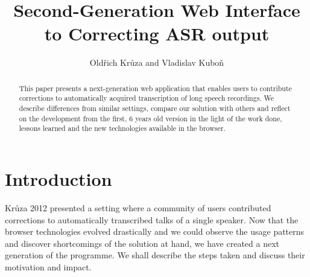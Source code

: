 \documentclass{svproc}
\begin{document}
\mainmatter              %
%
\title{Second-Generation Web Interface to Correcting ASR output}
%
%
\author{Old\v{r}ich Kr\r{u}za and Vladislav Kubo\v{n}}
%
%
%

\maketitle              %

\begin{abstract}
This paper presents a next-generation web application that enables users to
contribute corrections to automatically acquired transcription of long speech
recordings. We describe differences from similar settings, compare our solution
with others and reflect on the development from the first, 6 years old version
in the light of the work done, lessons learned and the new technologies
available in the browser.
\end{abstract}

\section{Introduction}

Kr\r{u}za 2012\cite{kruuza2012making} presented a setting where a community of
users contributed corrections to automatically transcribed talks of a single
speaker. Now that the browser technologies evolved drastically and we could
observe the usage patterns and discover shortcomings of the solution at hand, we
have created a next generation of the programme. We shall describe the steps
taken and discuss their motivation and impact.
\end{document}
